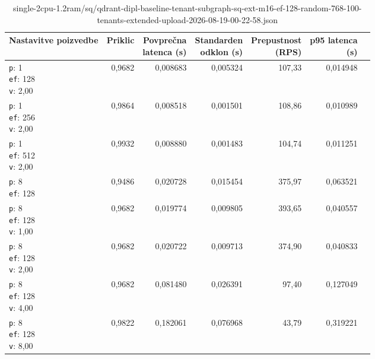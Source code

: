 \begin{table}[htbp]
  \centering
\small
  \caption{single-2cpu-1.2ram/sq/qdrant-dipl-baseline-tenant-subgraph-sq-ext-m16-ef-128-random-768-100-tenants-extended-upload-2026-08-19-00-22-58.json}
  \label{tab:single-2cpu-1.2ram:sq:qdrant-dipl-baseline-tenant-subgraph-sq-ext-m16-ef-128-random-768-100-tenants-extended-upload-2026-08-19-00-22-58.json}
  \begin{tabularx}{\textwidth}{Xrrrrrr}
    \toprule
    Nastavitve poizvedbe & Priklic & \makecell{Povprečna\\latenca (s)} & \makecell{Standarden\\odklon (s)} & \makecell{Prepustnost\\(RPS)} & \makecell{p95 latenca\\(s)}  \\
    \midrule
    \makecell{\texttt{p}: 1\\\texttt{ef}: 128\\\texttt{v}: 2,00} & 0,9682 & 0,008683 & 0,005324 & 107,33 & 0,014948 \\
    \makecell{\texttt{p}: 1\\\texttt{ef}: 256\\\texttt{v}: 2,00} & 0,9864 & 0,008518 & 0,001501 & 108,86 & 0,010989 \\
    \makecell{\texttt{p}: 1\\\texttt{ef}: 512\\\texttt{v}: 2,00} & 0,9932 & 0,008880 & 0,001483 & 104,74 & 0,011251 \\
    \makecell{\texttt{p}: 8\\\texttt{ef}: 128} & 0,9486 & 0,020728 & 0,015454 & 375,97 & 0,063521 \\
    \makecell{\texttt{p}: 8\\\texttt{ef}: 128\\\texttt{v}: 1,00} & 0,9682 & 0,019774 & 0,009805 & 393,65 & 0,040557 \\
    \makecell{\texttt{p}: 8\\\texttt{ef}: 128\\\texttt{v}: 2,00} & 0,9682 & 0,020722 & 0,009713 & 374,90 & 0,040833 \\
    \makecell{\texttt{p}: 8\\\texttt{ef}: 128\\\texttt{v}: 4,00} & 0,9682 & 0,081480 & 0,026391 & 97,40 & 0,127049 \\
    \makecell{\texttt{p}: 8\\\texttt{ef}: 128\\\texttt{v}: 8,00} & 0,9822 & 0,182061 & 0,076968 & 43,79 & 0,319221 \\

\end{tabularx}
\end{table}
